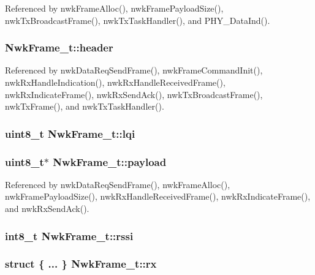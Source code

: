 Referenced by nwk\-Frame\-Alloc(), nwk\-Frame\-Payload\-Size(), nwk\-Tx\-Broadcast\-Frame(), nwk\-Tx\-Task\-Handler(), and P\-H\-Y\-\_\-\-Data\-Ind().

\hypertarget{struct_nwk_frame__t_ae7615117e566f339c8893bd6f6ed642d}{
\subsubsection[{header}]{ Nwk\-Frame\-\_\-t\-::header}}\label{struct_nwk_frame__t_ae7615117e566f339c8893bd6f6ed642d}


Referenced by nwk\-Data\-Req\-Send\-Frame(), nwk\-Frame\-Command\-Init(), nwk\-Rx\-Handle\-Indication(), nwk\-Rx\-Handle\-Received\-Frame(), nwk\-Rx\-Indicate\-Frame(), nwk\-Rx\-Send\-Ack(), nwk\-Tx\-Broadcast\-Frame(), nwk\-Tx\-Frame(), and nwk\-Tx\-Task\-Handler().

\hypertarget{struct_nwk_frame__t_ace554a195e09279c216c3efc6895e66f}{
\subsubsection[{lqi}]{\setlength{\rightskip}{0pt plus 5cm}uint8\-\_\-t Nwk\-Frame\-\_\-t\-::lqi}}\label{struct_nwk_frame__t_ace554a195e09279c216c3efc6895e66f}
\hypertarget{struct_nwk_frame__t_abe0e1d3be987a1a6fe8d6b9f19cefa67}{
\subsubsection[{payload}]{\setlength{\rightskip}{0pt plus 5cm}uint8\-\_\-t$\ast$ Nwk\-Frame\-\_\-t\-::payload}}\label{struct_nwk_frame__t_abe0e1d3be987a1a6fe8d6b9f19cefa67}


Referenced by nwk\-Data\-Req\-Send\-Frame(), nwk\-Frame\-Alloc(), nwk\-Frame\-Payload\-Size(), nwk\-Rx\-Handle\-Received\-Frame(), nwk\-Rx\-Indicate\-Frame(), and nwk\-Rx\-Send\-Ack().

\hypertarget{struct_nwk_frame__t_ae99f976337170b91bab3c91efee0c19e}{
\subsubsection[{rssi}]{\setlength{\rightskip}{0pt plus 5cm}int8\-\_\-t Nwk\-Frame\-\_\-t\-::rssi}}\label{struct_nwk_frame__t_ae99f976337170b91bab3c91efee0c19e}
\hypertarget{struct_nwk_frame__t_af342a861746a0f6f40285195c4959a9e}{
\subsubsection[{rx}]{\setlength{\rightskip}{0pt plus 5cm}struct \{ ... \}   Nwk\-Frame\-\_\-t\-::rx}}\label{struct_nwk_frame__t_af342a861746a0f6f40285195c4959a9e}


